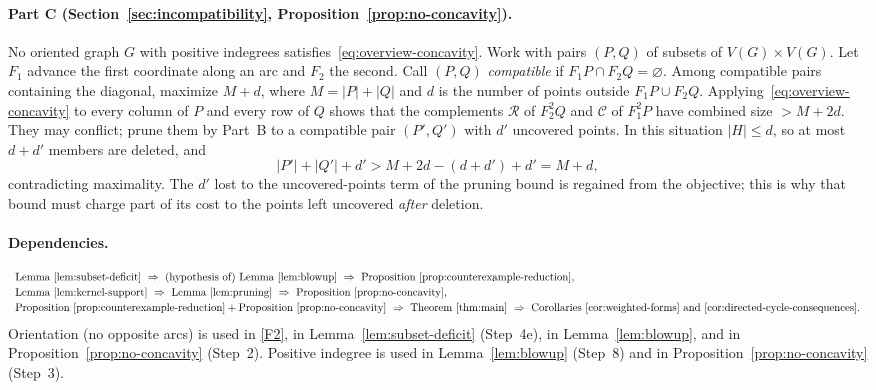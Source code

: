 \documentclass[11pt]{article}
\theoremstyle{remark}
\newcommand{\abs}[1]{\lvert #1\rvert}
\begin{document}
\paragraph{Part C (Section~\ref{sec:incompatibility},
Proposition~\ref{prop:no-concavity}).}
No oriented graph $G$ with positive indegrees
satisfies~\eqref{eq:overview-concavity}.  Work with pairs $(P,Q)$ of subsets
of $V(G)\times V(G)$.  Let $F_1$ advance the first coordinate along an arc and
$F_2$ the second.  Call $(P,Q)$ \emph{compatible} if
$F_1P\cap F_2Q=\varnothing$.  Among compatible pairs containing the diagonal,
maximize $M+d$, where $M=\abs P+\abs Q$ and $d$ is the number of points
outside $F_1P\cup F_2Q$.  Applying~\eqref{eq:overview-concavity} to every
column of $P$ and every row of $Q$ shows that the complements
$\mathcal R$ of $F_2^2Q$ and $\mathcal C$ of $F_1^2P$ have combined size
$>M+2d$.  They may conflict; prune them by Part~B to a compatible pair
$(P',Q')$ with $d'$ uncovered points.  In this situation $\abs H\le d$, so at
most $d+d'$ members are deleted, and
\[
 \abs{P'}+\abs{Q'}+d' > M+2d-(d+d')+d'=M+d,
\]
contradicting maximality.  The $d'$ lost to the uncovered-points term of the
pruning bound is regained from the objective; this is why that bound must
charge part of its cost to the points left uncovered \emph{after} deletion.

\paragraph{Dependencies.}
\[
\begin{array}{l}
\text{Lemma~\ref{lem:subset-deficit}}\ \Rightarrow\
\text{(hypothesis of) Lemma~\ref{lem:blowup}}\ \Rightarrow\
\text{Proposition~\ref{prop:counterexample-reduction}},\\[2pt]
\text{Lemma~\ref{lem:kernel-support}}\ \Rightarrow\
\text{Lemma~\ref{lem:pruning}}\ \Rightarrow\
\text{Proposition~\ref{prop:no-concavity}},\\[2pt]
\text{Proposition~\ref{prop:counterexample-reduction}}
 +\text{Proposition~\ref{prop:no-concavity}}\ \Rightarrow\
\text{Theorem~\ref{thm:main}}\ \Rightarrow\
\text{Corollaries~\ref{cor:weighted-forms}
 and~\ref{cor:directed-cycle-consequences}}.
\end{array}
\]
Orientation (no opposite arcs) is used in \ref{F2}, in
Lemma~\ref{lem:subset-deficit} (Step~4e), in Lemma~\ref{lem:blowup}, and in
Proposition~\ref{prop:no-concavity} (Step~2).  Positive indegree is used in
Lemma~\ref{lem:blowup} (Step~8) and in Proposition~\ref{prop:no-concavity}
(Step~3).
\end{document}
